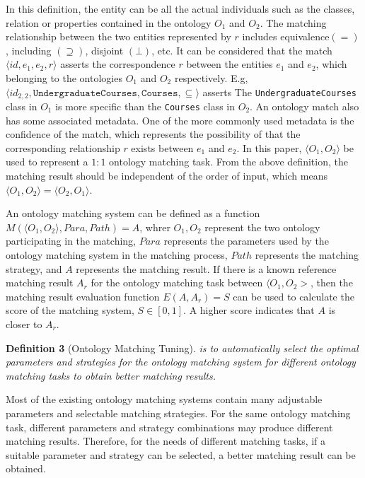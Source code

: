\documentclass[twoside]{article}
\begin{document}
\begin{multicols}{2}
In this definition, the entity can be all the actual individuals such as the classes, relation or properties contained in the ontology $ {O_1} $ and $ {O_2} $.
The matching relationship between the two entities represented by $ r $ includes equivalence$ (=) $, including $ (\supseteq) $, disjoint $ (\bot) $, etc.
It can be considered that the match $ \langle id, {e_1}, {e_2}, r \rangle $ asserts the correspondence $ r $ between the entities $ {e_1} $ and $ {e_2} $, which belonging to the ontologies $ {O_{1}} $ and $ {O_ {2}} $ respectively.
E.g, $ \langle id_ {2,2}, \texttt {UndergraduateCourses}, \texttt {Courses}, \subseteq \rangle $ asserts The \texttt {UndergraduateCourses} class in $ {O_ {1}} $ is more specific than the \texttt {Courses} class in $ {O_ {2}} $.
An ontology match also has some associated metadata. One of the more commonly used metadata is the confidence of the match, which represents the possibility of that the corresponding relationship $ r $ exists between $ {e_1} $ and $ {e_2} $.
In this paper, $ \langle O_1, O_2\rangle $ be used to represent a $ 1: 1 $ ontology matching task. 
From the above definition, the matching result should be independent of the order of input, which means $ \langle O_1, O_2\rangle = \langle O_2, O_1\rangle $. 

An ontology matching system can be defined as a function $ M (\langle O_1, O_2\rangle , Para, Path) = A $, whrer $ O_1, O_2 $ represent the two ontology participating in the matching, $ Para $ represents the parameters used by the ontology matching system in the matching process, $ Path $ represents the matching strategy, and $ A $ represents the matching result.
If there is a known reference matching result $ A_r $ for the ontology matching task between $ \langle O_1, O_2> $, then the matching result evaluation function $ E (A, A_r) = S $ can be used to calculate the score of the matching system, $ S \in [0,1] $. A higher score indicates that $ A $ is closer to $ A_r $.



{\bf Definition 3} (Ontology Matching Tuning). {\it is to automatically select the optimal parameters and strategies for the ontology matching system for different ontology matching tasks to obtain better matching results.}

Most of the existing ontology matching systems contain many adjustable parameters and selectable matching strategies. For the same ontology matching task, different parameters and strategy combinations may produce different matching results. 
Therefore, for the needs of different matching tasks, if a suitable parameter and strategy can be selected, a better matching result can be obtained.




\end{multicols}
\end{document}
